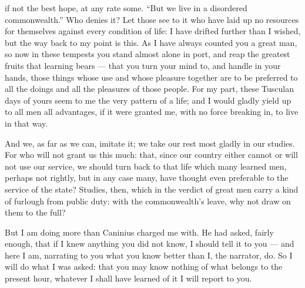  if not the best hope, at any rate some. ``But we live in a disordered commonwealth.'' Who denies it? Let those see to it who have laid up no resources for themselves against every condition of life: I have drifted further than I wished, but the way back to my point is this. As I have always counted you a great man, so now in these tempests you stand almost alone in port, and reap the greatest fruits that learning bears --- that you turn your mind to, and handle in your hands, those things whose use and whose pleasure together are to be preferred to all the doings and all the pleasures of those people. For my part, these Tusculan days of yours seem to me the very pattern of a life; and I would gladly yield up to all men all advantages, if it were granted me, with no force breaking in, to live in that way.

 And we, as far as we can, imitate it; we take our rest most gladly in our studies. For who will not grant us this much: that, since our country either cannot or will not use our service, we should turn back to that life which many learned men, perhaps not rightly, but in any case many, have thought even preferable to the service of the state? Studies, then, which in the verdict of great men carry a kind of furlough from public duty: with the commonwealth's leave, why not draw on them to the full?

 But I am doing more than Caninius charged me with. He had asked, fairly enough, that if I knew anything you did not know, I should tell it to you --- and here I am, narrating to you what you know better than I, the narrator, do. So I will do what I was asked: that you may know nothing of what belongs to the present hour, whatever I shall have learned of it I will report to you.
